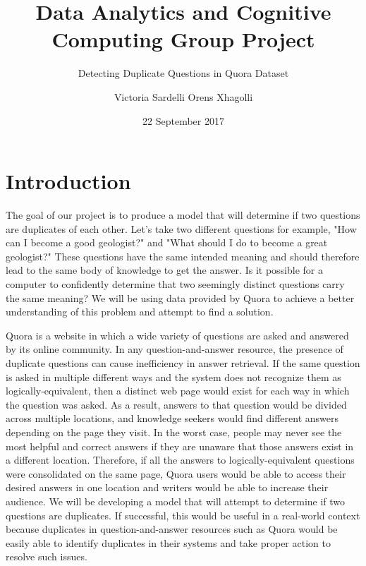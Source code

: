 \documentclass{sig-alternate}
\begin{document}
\title{Data Analytics and Cognitive Computing Group Project}
\subtitle{Detecting Duplicate Questions in Quora Dataset}
\author{
\alignauthor
Victoria Sardelli
\alignauthor
Orens Xhagolli
}
\date{22 September 2017}
\maketitle

\section{Introduction}
\label{introduction}
The goal of our project is to produce a model that will determine if two questions are duplicates of each other. Let's take two different questions for example, "How can I become a good geologist?" and "What should I do to become a great geologist?" These questions have the same intended meaning and should therefore lead to the same body of knowledge to get the answer. Is it possible for a computer to confidently determine that two seemingly distinct questions carry the same meaning? We will be using data provided by Quora to achieve a better understanding of this problem and attempt to find a solution.

Quora is a website in which a wide variety of questions are asked and answered by its online community. In any question-and-answer resource, the presence of duplicate questions can cause inefficiency in answer retrieval. If the same question is asked in multiple different ways and the system does not recognize them as logically-equivalent, then a distinct web page would exist for each way in which the question was asked. As a result, answers to that question would be divided across multiple locations, and knowledge seekers would find different answers depending on the page they visit. In the worst case, people may never see the most helpful and correct answers if they are unaware that those answers exist in a different location. Therefore, if all the answers to logically-equivalent questions were consolidated on the same page, Quora users would be able to access their desired answers in one location and writers would be able to increase their audience. We will be developing a model that will attempt to determine if two questions are duplicates. If successful, this would be useful in a real-world context because duplicates in question-and-answer resources such as Quora would be easily able to identify duplicates in their systems and take proper action to resolve such issues.
\end{document}

